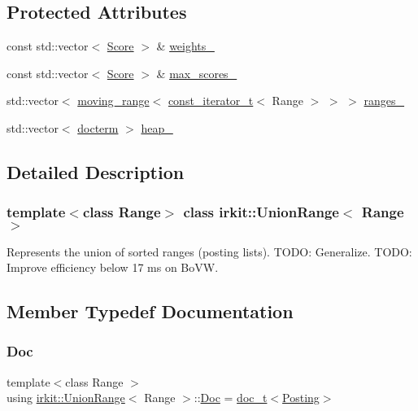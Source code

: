 \subsection*{Protected Attributes}
\begin{DoxyCompactItemize}
\item 
const std\+::vector$<$ \hyperlink{classirkit_1_1UnionRange_a47fb098a85581f5e33f4203e16245dae}{Score} $>$ \& \hyperlink{classirkit_1_1UnionRange_a0c53eb9b1c9e8aa18621f4c129a6ff90}{weights\+\_\+}
\item 
const std\+::vector$<$ \hyperlink{classirkit_1_1UnionRange_a47fb098a85581f5e33f4203e16245dae}{Score} $>$ \& \hyperlink{classirkit_1_1UnionRange_a980f7cfaf14c7c4d93b13b6d7ce6a859}{max\+\_\+scores\+\_\+}
\item 
std\+::vector$<$ \hyperlink{structirkit_1_1moving__range}{moving\+\_\+range}$<$ \hyperlink{namespaceirkit_a4b1668583041117eb42c1b5a1091b804}{const\+\_\+iterator\+\_\+t}$<$ Range $>$ $>$ $>$ \hyperlink{classirkit_1_1UnionRange_acb9b9e969f1c90bb18bf1e4eb99f124b}{ranges\+\_\+}
\item 
std\+::vector$<$ \hyperlink{structirkit_1_1UnionRange_1_1docterm}{docterm} $>$ \hyperlink{classirkit_1_1UnionRange_a613eebb9b7b8601bffdad1d842c8c7f0}{heap\+\_\+}
\end{DoxyCompactItemize}


\subsection{Detailed Description}
\subsubsection*{template$<$class Range$>$\newline
class irkit\+::\+Union\+Range$<$ Range $>$}

Represents the union of sorted ranges (posting lists). T\+O\+DO\+: Generalize. T\+O\+DO\+: Improve efficiency below 17 ms on Bo\+VW. 

\subsection{Member Typedef Documentation}
\mbox{\label{classirkit_1_1UnionRange_a387589b1f09868b60485c4ab8c61f97a}} 
\subsubsection{\texorpdfstring{Doc}{Doc}}
{\footnotesize\ttfamily template$<$class Range $>$ \\
using \hyperlink{classirkit_1_1UnionRange}{irkit\+::\+Union\+Range}$<$ Range $>$\+::\hyperlink{classirkit_1_1UnionRange_a387589b1f09868b60485c4ab8c61f97a}{Doc} =  \hyperlink{namespaceirkit_a595d83053e112c98ab2a1b65e5dd74be}{doc\+\_\+t}$<$\hyperlink{classirkit_1_1UnionRange_a5f694970419f5a60d7fd41d740556229}{Posting}$>$\hspace{0.3cm}{\ttfamily [protected]}}

